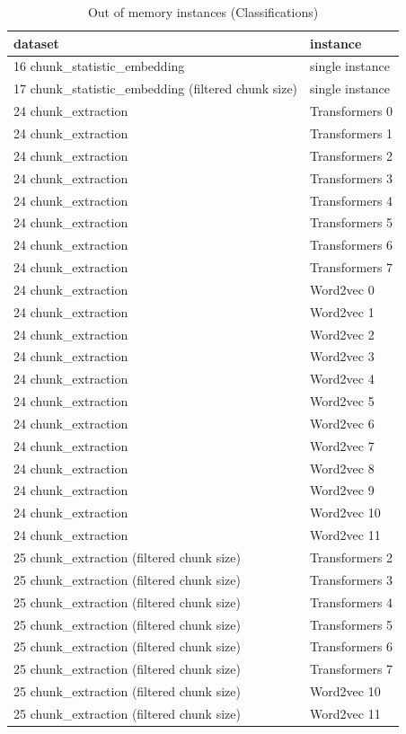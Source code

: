 \begin{table}[H]
\centering
\begin{tabular}{ll}
\hline
dataset & instance \\ 
\hline
16 chunk\_statistic\_embedding & single instance \\ 
17 chunk\_statistic\_embedding (filtered chunk size) & single instance \\ 
24 chunk\_extraction & Transformers 0 \\ 
24 chunk\_extraction & Transformers 1 \\ 
24 chunk\_extraction & Transformers 2 \\ 
24 chunk\_extraction & Transformers 3 \\ 
24 chunk\_extraction & Transformers 4 \\ 
24 chunk\_extraction & Transformers 5 \\ 
24 chunk\_extraction & Transformers 6 \\ 
24 chunk\_extraction & Transformers 7 \\ 
24 chunk\_extraction & Word2vec 0 \\ 
24 chunk\_extraction & Word2vec 1 \\ 
24 chunk\_extraction & Word2vec 2 \\ 
24 chunk\_extraction & Word2vec 3 \\ 
24 chunk\_extraction & Word2vec 4 \\ 
24 chunk\_extraction & Word2vec 5 \\ 
24 chunk\_extraction & Word2vec 6 \\ 
24 chunk\_extraction & Word2vec 7 \\ 
24 chunk\_extraction & Word2vec 8 \\ 
24 chunk\_extraction & Word2vec 9 \\ 
24 chunk\_extraction & Word2vec 10 \\ 
24 chunk\_extraction & Word2vec 11 \\ 
25 chunk\_extraction (filtered chunk size) & Transformers 2 \\ 
25 chunk\_extraction (filtered chunk size) & Transformers 3 \\ 
25 chunk\_extraction (filtered chunk size) & Transformers 4 \\ 
25 chunk\_extraction (filtered chunk size) & Transformers 5 \\ 
25 chunk\_extraction (filtered chunk size) & Transformers 6 \\ 
25 chunk\_extraction (filtered chunk size) & Transformers 7 \\ 
25 chunk\_extraction (filtered chunk size) & Word2vec 10 \\ 
25 chunk\_extraction (filtered chunk size) & Word2vec 11 \\ 
\hline
\end{tabular}
\caption{Out of memory instances (Classifications)}
\label{tab:annexe:out_of_memory_instances_classifications}
\end{table}

